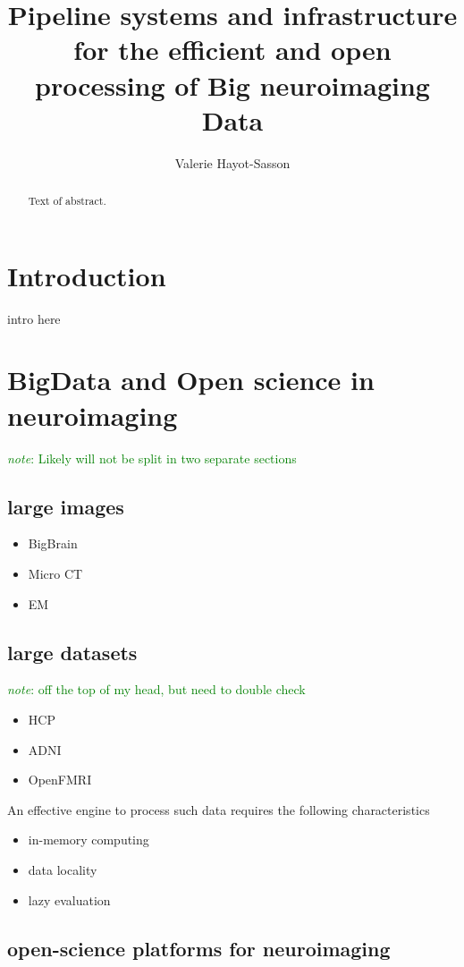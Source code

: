 \documentclass{report}
\newcommand{\note}[1]{\textcolor{green}{\textit{note}: #1}}
\begin{document}
\title{Pipeline systems and infrastructure for the efficient and open processing of Big neuroimaging Data}
\author{Valerie Hayot-Sasson}
\maketitle
\begin{abstract}
  Text of abstract.  
\end{abstract}
\tableofcontents
\chapter{Introduction}
intro here
\chapter{BigData and Open science in neuroimaging}
    \note{Likely will not be split in two separate sections}
    \section{large images}
        \begin{itemize}  
            \item BigBrain
            \item Micro CT 
            \item EM 
        \end{itemize}
    \section{large datasets}
    	\note{off the top of my head, but need to double check}
        \begin{itemize}
            \item HCP
            \item ADNI
            \item OpenFMRI
        \end{itemize}
    An effective engine to process such data requires the following characteristics
        \begin{itemize}
            \item in-memory computing
            \item data locality
            \item lazy evaluation
        \end{itemize}
        \section{open-science platforms for neuroimaging}
\end{document}
